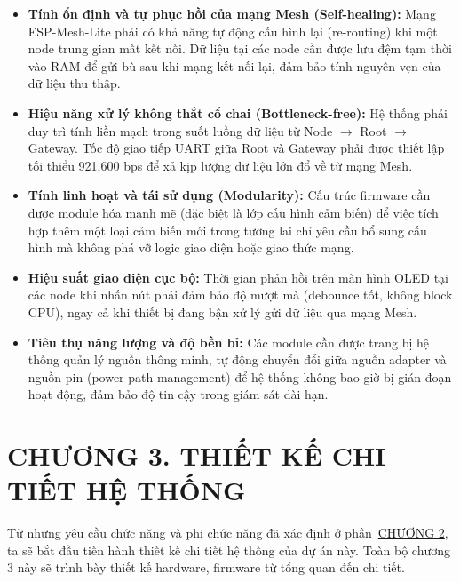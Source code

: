 \documentclass{article} %
\begin{document}
\begin{itemize}
    \item \textbf{Tính ổn định và tự phục hồi của mạng Mesh (Self-healing):}  
    Mạng ESP-Mesh-Lite phải có khả năng tự động cấu hình lại (re-routing) khi một node trung gian mất kết nối. Dữ liệu tại các node cần được lưu đệm tạm thời vào RAM để gửi bù sau khi mạng kết nối lại, đảm bảo tính nguyên vẹn của dữ liệu thu thập.

    \item \textbf{Hiệu năng xử lý không thắt cổ chai (Bottleneck-free):}  
    Hệ thống phải duy trì tính liền mạch trong suốt luồng dữ liệu từ Node $\rightarrow$ Root $\rightarrow$ Gateway. Tốc độ giao tiếp UART giữa Root và Gateway phải được thiết lập tối thiểu 921,600 bps để xả kịp lượng dữ liệu lớn đổ về từ mạng Mesh.

    \item \textbf{Tính linh hoạt và tái sử dụng (Modularity):}  
    Cấu trúc firmware cần được module hóa mạnh mẽ (đặc biệt là lớp cấu hình cảm biến) để việc tích hợp thêm một loại cảm biến mới trong tương lai chỉ yêu cầu bổ sung cấu hình mà không phá vỡ logic giao diện hoặc giao thức mạng.

    \item \textbf{Hiệu suất giao diện cục bộ:}  
    Thời gian phản hồi trên màn hình OLED tại các node khi nhấn nút phải đảm bảo độ mượt mà (debounce tốt, không block CPU), ngay cả khi thiết bị đang bận xử lý gửi dữ liệu qua mạng Mesh.

    \item \textbf{Tiêu thụ năng lượng và độ bền bỉ:}  
    Các module cần được trang bị hệ thống quản lý nguồn thông minh, tự động chuyển đổi giữa nguồn adapter và nguồn pin (power path management) để hệ thống không bao giờ bị gián đoạn hoạt động, đảm bảo độ tin cậy trong giám sát dài hạn.
\end{itemize}

\newpage
\section*{CHƯƠNG 3. THIẾT KẾ CHI TIẾT HỆ THỐNG}
\setcounter{section}{3}
\setcounter{subsection}{0}
\setcounter{figure}{0}
\setcounter{table}{0}
Từ những yêu cầu chức năng và phi chức năng đã xác định ở phần~\hyperref[chuong2]{CHƯƠNG 2}, ta sẽ bắt đầu tiến hành thiết kế chi tiết hệ thống
của dự án này. Toàn bộ chương 3 này sẽ trình bày thiết kế hardware, firmware từ tổng quan đến chi tiết.
\end{document}
